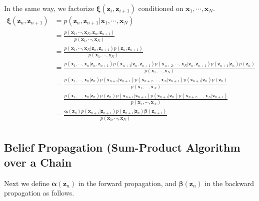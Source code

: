 \documentclass[a4]{article}
\begin{document}
In the same way, we factorize $\bm{\xi}(\bm{z}_i, \bm{z}_{i+1})$ conditioned on $\bm{x}_1, \cdots, \bm{x}_N$.
\begin{equation}
\begin{aligned}
\bm{\xi}(\bm{z}_n, \bm{z}_{n+1}) &= p(\bm{z}_n, \bm{z}_{n+1}|\bm{x}_1, \cdots, \bm{x}_N)\\
&= \frac{
    p(\bm{x}_1, \cdots, \bm{x}_N , \bm{z}_n, \bm{z}_{n+1})
}
{
    p(\bm{x}_1, \cdots, \bm{x}_N)
}\\
&= \frac{
    p(\bm{x}_1, \cdots, \bm{x}_N | \bm{z}_{n}, \bm{z}_{n+1})p(\bm{z}_n, \bm{z}_{n+1})
}
{
    p(\bm{x}_1, \cdots, \bm{x}_N)
}\\
&= \frac{
    p(\bm{x}_1,     \cdots, \bm{x}_n | \bm{z}_{n}, \bm{z}_{n+1})
    p(\bm{x}_{n+1}                   | \bm{z}_{n}, \bm{z}_{n+1})
    p(\bm{x}_{n+2}, \cdots, \bm{x}_N | \bm{z}_{n}, \bm{z}_{n+1})p(\bm{z}_{n+1} | \bm{z}_{n}) p(\bm{z}_{n})
}
{
    p(\bm{x}_1, \cdots, \bm{x}_N)
}\\
&= \frac{
    p(\bm{x}_1,     \cdots, \bm{x}_n | \bm{z}_{n} )
    p(\bm{x}_{n+1}                   | \bm{z}_{n+1})
    p(\bm{x}_{n+2}, \cdots, \bm{x}_N | \bm{z}_{n+1})p(\bm{z}_{n+1} | \bm{z}_{n}) p(\bm{z}_{n})
}
{
    p(\bm{x}_1, \cdots, \bm{x}_N)
}\\
&= \frac{
    p(\bm{x}_1,     \cdots, \bm{x}_n | \bm{z}_{n} ) p(\bm{z}_{n})
    p(\bm{x}_{n+1}                   | \bm{z}_{n+1})p(\bm{z}_{n+1} | \bm{z}_{n})
    p(\bm{x}_{n+2}, \cdots, \bm{x}_N | \bm{z}_{n+1})
}
{
    p(\bm{x}_1, \cdots, \bm{x}_N)
}\\
&= \frac{
    \bm{\alpha}(\bm{z}_n)
    p(\bm{x}_{n+1} | \bm{z}_{n+1})p(\bm{z}_{n+1} | \bm{z}_{n})
    \bm{\beta}(\bm{z}_{n+1})
}
{
    p(\bm{x}_1, \cdots, \bm{x}_N)
}\\
\end{aligned}
\end{equation}

\subsection{Belief Propagation (Sum-Product Algorithm over a Chain}
Next we define  $\bm{\alpha}(\bm{z}_n)$ in the forward propagation, and $\bm{\beta}(\bm{z}_{n})$ in the
backward propagation as follows.
\end{document}
